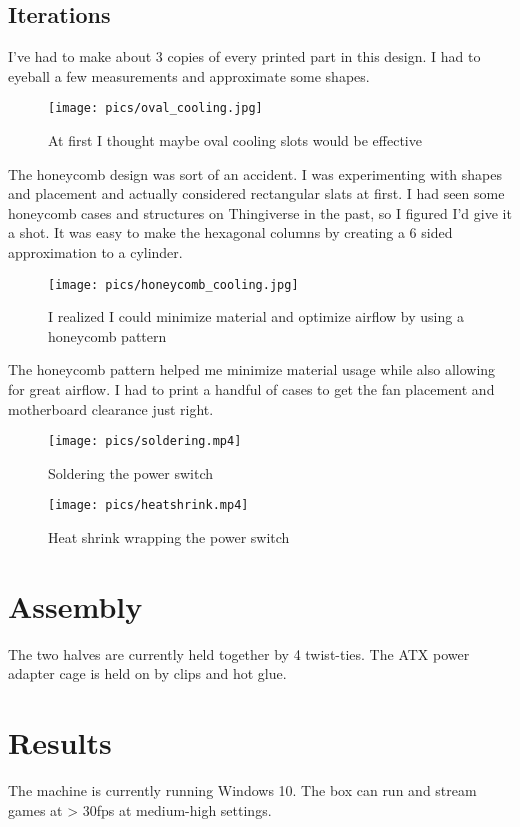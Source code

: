 \documentclass{article}
\begin{document}
\subsection{Iterations}
I've had to make about 3 copies of every printed part in this design. I had to eyeball a few measurements and approximate some shapes. 
\begin{figure}[h]
\texttt{[image: pics/oval\_cooling.jpg]}
\caption{At first I thought maybe oval cooling slots would be effective}
\end{figure}
The honeycomb design was sort of an accident. I was experimenting with shapes and placement and actually considered rectangular slats at first. I had seen some honeycomb cases and structures on Thingiverse in the past, so I figured I'd give it a shot. It was easy to make the hexagonal columns by creating a 6 sided approximation to a cylinder.

\begin{figure}[h]
\texttt{[image: pics/honeycomb\_cooling.jpg]}
\caption{I realized I could minimize material and optimize airflow by using a honeycomb pattern}
\end{figure}
The honeycomb pattern helped me minimize material usage while also allowing for great airflow. I had to print a handful of cases to get the fan placement and motherboard clearance just right.

\begin{figure}[h]
\texttt{[image: pics/soldering.mp4]}
\caption{Soldering the power switch}
\end{figure}

\begin{figure}[h]
\texttt{[image: pics/heatshrink.mp4]}
\caption{Heat shrink wrapping the power switch}
\end{figure}

\section{Assembly}
The two halves are currently held together by 4 twist-ties. The ATX power adapter cage is held on by clips and hot glue.

\section{Results}
The machine is currently running Windows 10. The box can run and stream games at > 30fps at medium-high settings.
\end{document}
